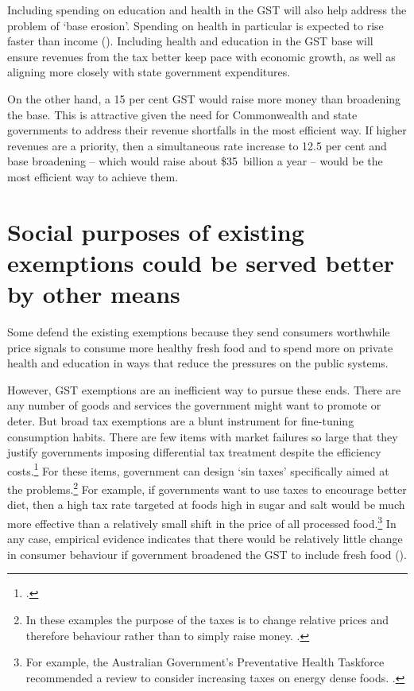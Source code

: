 \documentclass{grattanAlpha}
\begin{document}
Including spending on education and health in the GST will also help address the problem of ‘base erosion’. Spending on health in particular is expected to rise faster than income (). Including health and education in the GST base will ensure revenues from the tax better keep pace with economic growth, as well as aligning more closely with state government expenditures. 

On the other hand, a 15 per cent GST would raise more money than broadening the base. This is attractive given the need for Commonwealth and state governments to address their revenue shortfalls in the most efficient way. If higher revenues are a priority, then a simultaneous rate increase to 12.5 per cent and base broadening – which would raise about \$35~billion a year – would be the most efficient way to achieve them. 

\section{Social purposes of existing exemptions could be served better by other means\label{sec:GST-2-4}}
Some defend the existing exemptions because they send consumers worthwhile price signals to consume more healthy fresh food and to spend more on private health and education in ways that reduce the pressures on the public systems. 

However, GST exemptions are an inefficient way to pursue these ends. There are any number of goods and services the government might want to promote or deter. But broad tax exemptions are a blunt instrument for fine-tuning consumption habits. There are few items with market failures so large that they justify governments imposing differential tax treatment despite the efficiency costs.\footcite[][163]{MirrleesAdamBesleyEtAl2011}  For these items, government can design ‘sin taxes’ specifically aimed at the problems.\footnote{In these examples the purpose of the taxes is to change relative prices and therefore behaviour rather than to simply raise money. \textcites{MirrleesAdamBesleyEtAl2011}{HenryTaxReview2010}.}  For example, if governments want to use taxes to encourage better diet, then a high tax rate targeted at foods high in sugar and salt would be much more effective than a relatively small shift in the price of all processed food.\footnote{For example, the Australian Government’s Preventative Health Taskforce recommended a review to consider increasing taxes on energy dense foods. \textcite[][15]{Preventative-Taskforce2008-Australia-Healthiest-Country-by-2020}.}  In any case, empirical evidence indicates that there would be relatively little change in consumer behaviour if government broadened the GST to include fresh food ().
\end{document}
